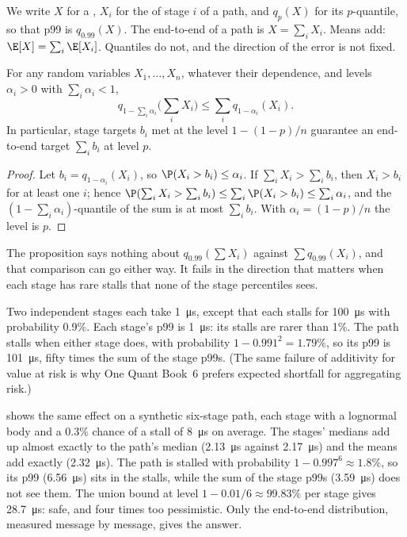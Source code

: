 We write $X$ for a , $X_i$ for the  of stage $i$ of a path, and $q_p(X)$ for its $p$-quantile, so that
p99 is $q_{0.99}(X)$. The end-to-end  of a path is $X = \sum_i X_i$. Means add: $\E[X] = \sum_i \E[X_i]$.
Quantiles do not, and the direction of the error is not fixed.

\begin{proposition}\label{prop:ll:where-latency-comes-from:union}
For any random variables $X_1,\dots,X_n$, whatever their dependence, and levels $\alpha_i > 0$ with $\sum_i \alpha_i < 1$,
\[
q_{1-\sum_i \alpha_i}\Big(\sum_i X_i\Big) \le \sum_i q_{1-\alpha_i}(X_i).
\]
In particular, stage targets $b_i$ met at the level $1-(1-p)/n$ guarantee an end-to-end target $\sum_i b_i$ at
level $p$.
\end{proposition}

\begin{proof}
Let $b_i = q_{1-\alpha_i}(X_i)$, so $\P(X_i > b_i) \le \alpha_i$. If $\sum_i X_i > \sum_i b_i$, then $X_i > b_i$ for
at least one $i$; hence $\P(\sum_i X_i > \sum_i b_i) \le \sum_i \P(X_i > b_i) \le \sum_i \alpha_i$, and the
$(1-\sum_i\alpha_i)$-quantile of the sum is at most $\sum_i b_i$. With $\alpha_i = (1-p)/n$ the level is $p$.
\end{proof}

The proposition says nothing about $q_{0.99}(\sum X_i)$ against $\sum q_{0.99}(X_i)$, and that comparison can go
either way. It fails in the direction that matters when each stage has rare stalls that none of the stage
percentiles sees.

\begin{example}\label{ex:ll:where-latency-comes-from:nonsub}
Two independent stages each take \qty{1}{\micro\second}, except that each stalls for \qty{100}{\micro\second} with
probability 0.9\%. Each stage's p99 is \qty{1}{\micro\second}: its stalls are rarer than 1\%. The path stalls when
either stage does, with probability $1-0.991^2 = 1.79\%$, so its p99 is \qty{101}{\micro\second}, fifty times the
sum of the stage p99s. (The same failure of additivity for value at risk is why One Quant Book~6 prefers expected
shortfall for aggregating risk.)
\end{example}

 shows the same effect on a synthetic six-stage path, each stage with a
lognormal body and a 0.3\% chance of a stall of \qty{8}{\micro\second} on average. The stages' medians add up
almost exactly to the path's median (\qty{2.13}{\micro\second} against \qty{2.17}{\micro\second}) and the means add
exactly (\qty{2.32}{\micro\second}). The path is stalled with probability $1-0.997^6 \approx 1.8\%$, so its p99
(\qty{6.56}{\micro\second}) sits in the stalls, while the sum of the stage p99s (\qty{3.59}{\micro\second}) does
not see them. The union bound at level $1-0.01/6 \approx 99.83\%$ per stage gives \qty{28.7}{\micro\second}: safe,
and four times too pessimistic. Only the end-to-end distribution, measured message by message, gives the answer.

